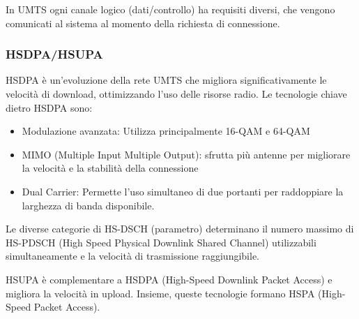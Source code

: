 In UMTS ogni canale logico (dati/controllo) ha requisiti diversi, che vengono comunicati al sistema al momento della richiesta di connessione. 

\subsubsection{HSDPA/HSUPA}

HSDPA è un'evoluzione della rete UMTS che migliora significativamente le velocità di download, ottimizzando l’uso delle risorse radio. Le tecnologie chiave dietro HSDPA sono:
\begin{itemize}
	\item Modulazione avanzata: Utilizza principalmente 16-QAM e 64-QAM

	\item MIMO (Multiple Input Multiple Output): sfrutta più antenne per migliorare la velocità e la stabilità della connessione

	\item Dual Carrier: Permette l'uso simultaneo di due portanti per raddoppiare la larghezza di banda disponibile.
\end{itemize}

Le diverse categorie di HS-DSCH (parametro) determinano il numero massimo di HS-PDSCH (High Speed Physical Downlink Shared Channel) utilizzabili simultaneamente e la velocità di trasmissione raggiungibile.

HSUPA è complementare a HSDPA (High-Speed Downlink Packet Access) e migliora la velocità in upload. Insieme, queste tecnologie formano HSPA (High-Speed Packet Access).

